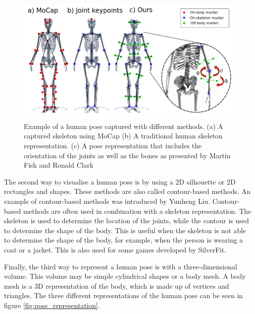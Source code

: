 \begin{figure}
    \centering
    \includegraphics[width=0.8\linewidth]{figures/HPE/PoseExample.png}
    \caption[Example for human Pose estimation]{Example of a human pose captured with different methods. (a) A captured skeleton using MoCap (b) A traditional human skeleton representation. (c) A pose representation that includes the orientation of the joints as well as the bones as presented by Martin Fish and Ronald Clark\cite{KeypointOrientation}}
    \label{fig:pose_example}
\end{figure}

The second way to visualise a human pose is by using a 2D silhouette or 2D rectangles and shapes. These methods are also called contour-based methods. An example of contour-based methods was introduced by Yunheng Liu\cite{contourHPE}. Contour-based methods are often used in combination with a skeleton representation. The skeleton is used to determine the location of the joints, while the contour is used to determine the shape of the body. This is useful when the skeleton is not able to determine the shape of the body, for example, when the person is wearing a coat or a jacket. This is also used for some games developed by SilverFit.

Finally, the third way to represent a human pose is with a three-dimensional volume. This volume may be simple cylindrical shapes or a body mesh. A body mesh is a 3D representation of the body, which is made up of vertices and triangles. The three different representations of the human pose can be seen in figure \ref{fig:pose_representation}.

